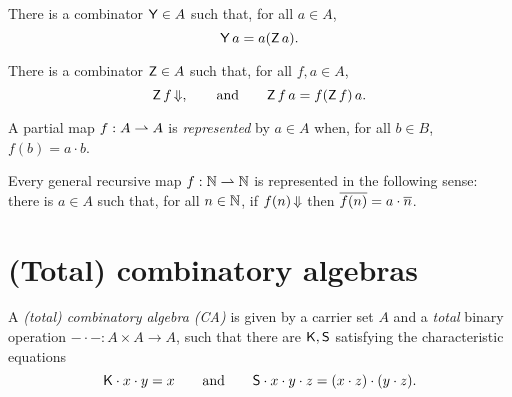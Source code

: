 \begin{definition}
  \label{def:combinator-Y}
  \leanok
  There is a combinator $\mathsf{Y} \in A$ such that, for all $a \in A$,
  \begin{equation*}
    \mathsf{Y} \, a = a (\mathsf{Z} \, a).
  \end{equation*}
\end{definition}

\begin{definition}
  \label{def:combinator-Z}
  \leanok
  There is a combinator $\mathsf{Z} \in A$ such that, for all $f, a \in A$,
  \begin{equation*}
    \mathsf{Z} \, f\,{\Downarrow},
    \qquad\text{and}\qquad
    \mathsf{Z} \, f \, a = f (\mathsf{Z} \, f) \, a.
  \end{equation*}
\end{definition}

\begin{definition}
  \label{def:representable-function}
  A partial map $f : A \rightharpoonup A$ is \emph{represented} by $a \in A$ when,
  for all $b \in B$, $f(b) = a \cdot b$.
\end{definition}

\begin{theorem}
  \label{thm:recursive-map-representable}
  Every general recursive map $f : \mathbb{N} \rightharpoonup \mathbb{N}$ is represented in the following sense:
  there is $a \in A$ such that, for all $n \in \mathbb{N}$, if $f(n)\,{\Downarrow}$ then $\overline{f(n)} = a \cdot \overline{n}$.
\end{theorem}

\section{(Total) combinatory algebras}
\label{sec:total-comb-algebr}

\begin{definition}
  \label{def:CA}
  \leanok
  A \emph{(total) combinatory algebra (CA)} is given by a carrier set $A$ and a \emph{total} binary operation
  ${-} \cdot {-} : A \times A \to A$, such that there are $\mathsf{K}, \mathsf{S}$ satisfying the characteristic
  equations
  \begin{equation*}
    \mathsf{K} \cdot x \cdot y = x
    \qquad\text{and}\qquad
    \mathsf{S} \cdot x \cdot y \cdot z = (x \cdot z) \cdot (y \cdot z).
  \end{equation*}
\end{definition}

